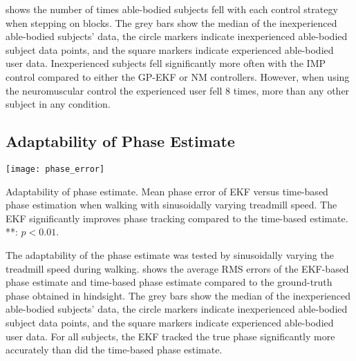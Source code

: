  shows the number of times able-bodied subjects fell
with each control strategy when stepping on blocks. The grey bars show the
median of the inexperienced able-bodied subjects' data, the circle markers
indicate inexperienced able-bodied subject data points, and the square markers
indicate experienced able-bodied user data. Inexperienced subjects fell
significantly more often with the IMP control compared to either the GP-EKF or
NM controllers.  However, when using the neuromuscular control the experienced
user fell 8 times, more than any other subject in any condition.

\subsection{Adaptability of Phase Estimate}

\begin{marginfigure}
    \centering
    \texttt{[image: phase\_error]} 
    \caption[Adaptability of phase estimate]{Adaptability of phase estimate.
    Mean phase error of EKF versus time-based phase estimation when walking with
    sinusoidally varying treadmill speed. The EKF significantly improves phase
    tracking compared to the time-based estimate. **: $p <
    0.01$.}\label{fig:speed_phase_err_mean}
\end{marginfigure}
The adaptability of the phase estimate was tested by sinusoidally varying the
treadmill speed during walking.  shows the
average RMS errors of the EKF-based phase estimate and time-based phase estimate
compared to the ground-truth phase obtained in hindsight. The grey bars show the
median of the inexperienced able-bodied subjects' data, the circle markers
indicate inexperienced able-bodied subject data points, and the square markers
indicate experienced able-bodied user data. For all subjects, the EKF tracked
the true phase significantly more accurately than did the time-based phase
estimate.

